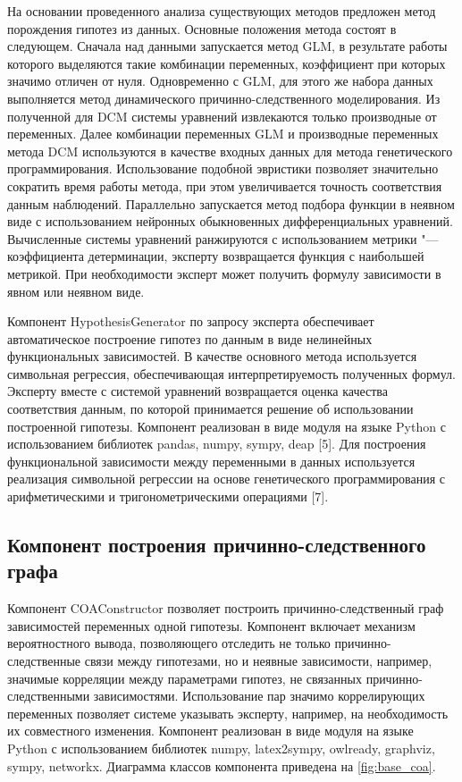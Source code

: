 На основании проведенного анализа существующих методов предложен метод порождения гипотез из данных. Основные 
положения метода состоят в следующем. Сначала над данными запускается метод GLM, в результате работы которого 
выделяются такие комбинации переменных, коэффициент при которых значимо отличен от нуля. Одновременно с GLM, для
 этого же набора данных выполняется метод динамического причинно-следственного моделирования. Из полученной для 
 DCM системы уравнений извлекаются только производные от переменных. Далее комбинации переменных GLM и производные 
 переменных метода DCM используются в качестве входных данных для метода генетического программирования. 
 Использование подобной эвристики позволяет значительно сократить время работы метода, при этом увеличивается 
 точность соответствия данным наблюдений. Параллельно запускается метод подбора функции в неявном виде с использованием 
 нейронных обыкновенных дифференциальных уравнений. Вычисленные системы уравнений ранжируются с использованием 
 метрики "--- коэффициента детерминации, эксперту возвращается функция с наибольшей метрикой. При необходимости 
 эксперт может получить формулу зависимости в явном или неявном виде.

Компонент HypothesisGenerator по запросу эксперта обеспечивает автоматическое построение гипотез по данным в виде 
нелинейных функциональных зависимостей. В качестве основного метода используется символьная регрессия, обеспечивающая 
интерпретируемость полученных формул. Эксперту вместе с системой уравнений возвращается оценка качества соответствия 
данным, по которой принимается решение об использовании построенной гипотезы. Компонент реализован в виде модуля на 
языке Python с использованием библиотек pandas, numpy, sympy, deap [5]. Для построения функциональной зависимости 
между переменными в данных используется реализация символьной регрессии на основе генетического программирования 
с арифметическими и тригонометрическими операциями [7]. 



\subsection{Компонент построения причинно-следственного графа}\label{sect_3_1_4}

Компонент COAConstructor позволяет построить причинно-следственный граф зависимостей переменных одной гипотезы. 
Компонент включает механизм вероятностного вывода, позволяющего отследить не только причинно-следственные связи между 
гипотезами, но и неявные зависимости, например, значимые корреляции между параметрами гипотез, не связанных 
причинно-следственными зависимостями. Использование пар значимо коррелирующих переменных позволяет системе указывать 
эксперту, например, на необходимость их совместного изменения. Компонент реализован в виде модуля на языке Python 
с использованием библиотек numpy, latex2sympy, owlready, graphviz, sympy, networkx. Диаграмма классов компонента 
приведена на \cref{fig:base_coa}.

